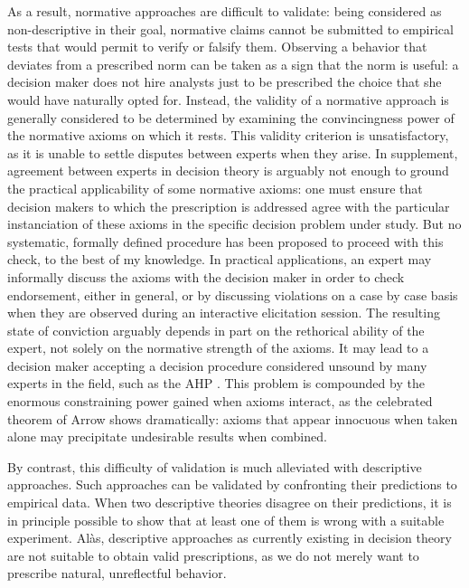 \documentclass[version=last, pagesize, twoside=off, bibliography=totoc, DIV=calc, fontsize=12pt, a4paper, french, english]{scrartcl}
\begin{document}
As a result, normative approaches are difficult to validate: being considered as non-descriptive in their goal, normative claims cannot be submitted to empirical tests that would permit to verify or falsify them. Observing a behavior that deviates from a prescribed norm can be taken as a sign that the norm is useful: a decision maker does not hire analysts just to be prescribed the choice that she would have naturally opted for.
Instead, the validity of a normative approach is generally considered to be determined by examining the convincingness power of the normative axioms on which it rests.
This validity criterion is unsatisfactory, as it is unable to settle disputes between experts when they arise. In supplement, agreement between experts in decision theory is arguably not enough to ground the practical applicability of some normative axioms: one must ensure that decision makers to which the prescription is addressed agree with the particular instanciation of these axioms in the specific decision problem under study. But no systematic, formally defined procedure has been proposed to proceed with this check, to the best of my knowledge. 
In practical applications, an expert may informally discuss the axioms with the decision maker in order to check endorsement, either in general, or by discussing violations on a case by case basis when they are observed during an interactive elicitation session. 
The resulting state of conviction arguably depends in part on the rethorical ability of the expert, not solely on the normative strength of the axioms. It may lead to a decision maker accepting a decision procedure considered unsound by many experts in the field, such as the \ac{AHP} \citep{smith_anniversary_2004}. 
This problem is compounded by the enormous constraining power gained when axioms interact, as the celebrated theorem of Arrow shows dramatically: axioms that appear innocuous when taken alone may precipitate undesirable results when combined.

By contrast, this difficulty of validation is much alleviated with descriptive approaches. Such approaches can be validated by confronting their predictions to empirical data. When two descriptive theories disagree on their predictions, it is in principle possible to show that at least one of them is wrong with a suitable experiment. 
Alàs, descriptive approaches as currently existing in decision theory are not suitable to obtain valid prescriptions, as we do not merely want to prescribe natural, unreflectful behavior.
\end{document}
